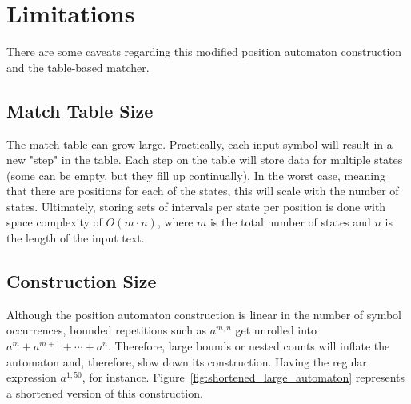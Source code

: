 \section{Limitations}
There are some caveats regarding this modified position automaton construction and the table-based matcher.

\subsection{Match Table Size}
The match table can grow large. Practically, each input symbol will result in a new "step" in the table. Each step on the table will store data for multiple states (some can be empty, but they fill up continually). In the worst case, meaning that there are positions for each of the states, this will scale with the number of states.
Ultimately, storing sets of intervals per state per position is done with space complexity of $O(m \cdot n)$, where $m$ is the total number of states and $n$ is the length of the input text.

\subsection{Construction Size}
Although the position automaton construction is linear in the number of symbol occurrences, bounded repetitions such as $a^{m,n}$ get unrolled into $a^m + a^{m+1} + \cdots + a^n$. Therefore, large bounds or nested counts will inflate the automaton and, therefore, slow down its construction.
Having the regular expression $a^{1,50}$, for instance. Figure~\ref{fig:shortened_large_automaton} represents a shortened version of this construction.

